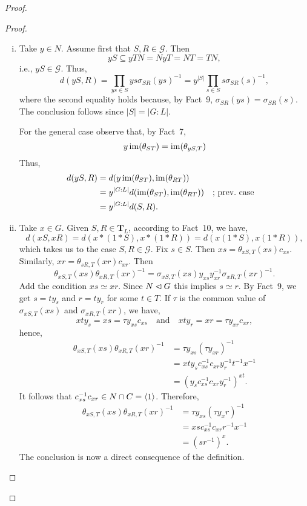 \begin{solution}
\begin{proof}
\begin{proof}
\begin{enumerate}[\rm a)]
{\begin{enumerate}[i)]
        \item Take $y\in N$. Assume first that $S,R\in\mathcal G$. Then
        $$
            yS \subseteq yTN = NyT= NT= TN,
        $$
        i.e., $yS\in\mathcal G$. Thus,
        $$
            d(yS,R)=\prod_{ys\in S} ys\sigma_{SR}(ys)^{-1}
                = y^{|S|}\prod_{s\in S}s\sigma_{SR}(s)^{-1},
        $$
        where the second equality holds because, by Fact~9, $\sigma_{SR}(ys)=\sigma_{SR}(s)$. The conclusion follows since $|S|=|G:L|$.

        For the general case observe that, by Fact~7,
        $$
            y\operatorname{im}(\theta_{ST})=\operatorname{im}(\theta_{yS,T})
        $$
        Thus,
        \begin{align*}
            d(yS,R) &= d(y\operatorname{im}(\theta_{ST}),\operatorname{im}(\theta_{RT}))\\
                &= y^{|G:L|}d(\operatorname{im}(\theta_{ST}),\operatorname{im}(\theta_{RT}))
                    &&\text{; prev.~case}\\
                &= y^{|G:L|}d(S,R).
        \end{align*}

        \item Take $x\in G$. Given $S,R\in\mathbf T_L$, according to Fact~10, we have,
        $$
            d(xS,xR) = d(x\ast(1\ast S),x\ast(1\ast R))
                = d(x(1\ast S),x(1\ast R)),
        $$
        which takes us to the case $S,R\in\mathcal G$. Fix $s\in S$. Then $xs=\theta_{xS,T}(xs)c_{xs}$. Similarly, $xr=\theta_{sR,T}(xr)c_{xr}$. Then
        $$
            \theta_{xS,T}(xs)\theta_{xR,T}(xr)^{-1}
                = \sigma_{xS,T}(xs)y_{xs}y_{xr}^{-1}\sigma_{xR,T}(xr)^{-1}.
        $$
        Add the condition $xs\simeq xr$. Since $N\lhd G$ this implies $s\simeq r$. By Fact~9, we get $s=ty_s$ and $r=ty_r$ for some $t\in T$. If $\tau$ is the common value of $\sigma_{xS,T}(xs)$ and $\sigma_{xR,T}(xr)$, we have,
        $$
            xty_s= xs =\tau y_{xs}c_{xs}\quad\text{and}
                \quad xty_r = xr = \tau y_{xr}c_{xr},
        $$
        hence,
        \begin{align*}
            \theta_{xS,T}(xs)\theta_{xR,T}(xr)^{-1}
                &=\tau y_{xs}(\tau y_{xr})^{-1}\\
                &= xty_sc_{xs}^{-1}c_{xr}y_r^{-1}t^{-1}x^{-1}\\
                &= (y_sc_{xs}^{-1}c_{xr}y_r^{-1})^{xt}.
        \end{align*}
        It follows that $c_{xs}^{-1}c_{xr}\in N\cap C=\langle1\rangle$. Therefore,
        \begin{align*}
            \theta_{xS,T}(xs)\theta_{xR,T}(xr)^{-1}
                &=\tau y_{xs}(\tau y_xr)^{-1}\\
                &= xsc_{xs}^{-1}c_{xr}r^{-1}x^{-1}\\
                &= (sr^{-1})^x.
        \end{align*}
        The conclusion is now a direct consequence of the definition.
        

\end{enumerate}}
\end{enumerate}
\end{proof}
\end{proof}
\end{solution}
